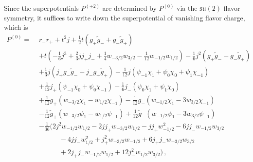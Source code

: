 \documentclass[12pt]{article}
\numberwithin{equation}{section}
\numberwithin{figure}{section}
\theoremstyle{plain}
\theoremstyle{definition}
\begin{document}
Since the superpotentials $P^{(\pm 2)}$ are determined by $P^{(0)}$ via the $\mathfrak{su}(2)$ flavor symmetry, it suffices to write down the superpotential of vanishing flavor charge, which is
\begin{equation}\label{eqn:N4SU3P0}
  \begin{aligned}
    P^{(0)} = \,\, & r_- r_+ + t^2 j + \frac{1}{2} t \left( g_+ \widetilde{g}_- + g_- \widetilde{g}_+ \right) \\
    & + t \left( -\frac{1}{6} j^3 + \frac{2}{3} j j_+ j_- + \frac{1}{4} w_{-3/2} w_{3/2} - \frac{1}{12} w_{-1/2} w_{1/2} \right) - \frac{1}{6} j^2 \left( g_+ \widetilde{g}_- + g_- \widetilde{g}_+ \right) \\
    & + \frac{1}{3} j \left( j_+ g_- \widetilde{g}_- + j_- g_+ \widetilde{g}_+ \right) - \frac{1}{12} j \left( \psi_{-1} \chi_1 + \psi_0 \chi_0 + \psi_1 \chi_{-1} \right) \\
    & + \frac{1}{12} j_+ \left( \psi_{-1} \chi_0 + \psi_0 \chi_{-1} \right) + \frac{1}{6} j_- \left( \psi_0 \chi_1 + \psi_1 \chi_0 \right) \\
    & + \frac{1}{12} g_+ \left( w_{-3/2} \chi_1 - w_{1/2} \chi_{-1} \right) - \frac{1}{12} g_- \left( w_{-1/2} \chi_1 - 3 w_{3/2} \chi_{-1} \right) \\
    & - \frac{1}{12} \widetilde{g}_+ \left( w_{-3/2} \psi_1 - w_{1/2} \psi_{-1} \right) + \frac{1}{12} \widetilde{g}_- \left( w_{-1/2} \psi_1 - 3 w_{3/2} \psi_{-1} \right) \\
    & - \frac{1}{36} \Big( 2 j^2 w_{-1/2} w_{1/2} - 2 j j_+ w_{-3/2} w_{1/2} - j j_+ w_{-1/2}^2 - 6 j j_- w_{-1/2} w_{3/2} \\
    & \qquad\quad - 4 j j_- w_{1/2}^2 + j_+^2 w_{-3/2} w_{-1/2} + 6 j_+ j_- w_{-3/2} w_{3/2} \\
    & \qquad\quad + 2 j_+ j_- w_{-1/2} w_{1/2} + 12 j_-^2 w_{1/2} w_{3/2} \Big) \,,
  \end{aligned}
\end{equation}
\end{document}
